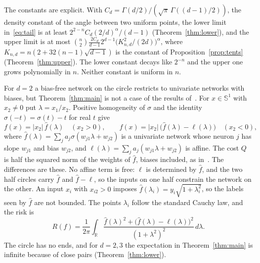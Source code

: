 \documentclass[11pt]{amsart}
\theoremstyle{remark}
\numberwithin{equation}{section}
\newcommand{\RR}{\mathbb{R}}
\begin{document}
The constants are explicit. With $C_d=\Gamma(d/2)/(\sqrt\pi\,\Gamma((d-1)/2))$, the density constant of the angle between two uniform points, the lower limit in~\eqref{eq:tail} is at least $2^{2-n}C_d(2/d)^{\alpha}/(d-1)$ (Theorem~\ref{thm:lower}), and the upper limit is at most $\binom n2\frac{2C_d}{d-1}2^{d-1}\bigl(K_{n,d}^2/(2d)\bigr)^{\alpha}$, where $K_{n,d}=n(2+32(n-1)\sqrt{d-1})$ is the constant of Proposition~\ref{prop:tents} (Theorem~\ref{thm:upper}). The lower constant decays like $2^{-n}$ and the upper one grows polynomially in $n$. Neither constant is uniform in $n$.

For $d=2$ a bias-free network on the circle restricts to univariate networks with biases, but Theorem~\ref{thm:main} is not a case of the results of~\cite{JVS}. For $x\in\mathbb S^1$ with $x_2\ne0$ put $\lambda=x_1/x_2$. Positive homogeneity of $\sigma$ and the identity $\sigma(-t)=\sigma(t)-t$ for real $t$ give
\[
f(x)=|x_2|\,\hat f(\lambda)\quad(x_2>0),\qquad f(x)=|x_2|\,\bigl(\hat f(\lambda)-\ell(\lambda)\bigr)\quad(x_2<0),
\]
where $\hat f(\lambda)=\sum_ja_j\sigma(w_{j1}\lambda+w_{j2})$ is a univariate network whose neuron $j$ has slope $w_{j1}$ and bias $w_{j2}$, and $\ell(\lambda)=\sum_ja_j(w_{j1}\lambda+w_{j2})$ is affine. The cost $Q$ is half the squared norm of the weights of $\hat f$, biases included, as in~\cite{JVS}. The differences are these. No affine term is free: $\ell$ is determined by $\hat f$, and the two half circles carry $\hat f$ and $\hat f-\ell$, so the inputs on one half constrain the network on the other. An input $x_i$ with $x_{i2}>0$ imposes $\hat f(\lambda_i)=y_i\sqrt{1+\lambda_i^2}$, so the labels seen by $\hat f$ are not bounded. The points $\lambda_i$ follow the standard Cauchy law, and the risk is
\[
R(f)=\frac1{2\pi}\int_{\RR}\frac{\hat f(\lambda)^2+\bigl(\hat f(\lambda)-\ell(\lambda)\bigr)^2}{(1+\lambda^2)^2}\,d\lambda .
\]
The circle has no ends, and for $d=2,3$ the expectation in Theorem~\ref{thm:main} is infinite because of close pairs (Theorem~\ref{thm:lower}).
\end{document}
